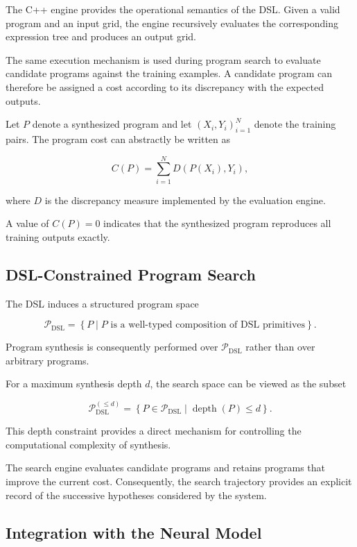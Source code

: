 \documentclass[final]{nesy2027}
\begin{document}
The C++ engine provides the operational semantics of the DSL. Given a valid
program and an input grid, the engine recursively evaluates the corresponding
expression tree and produces an output grid.

The same execution mechanism is used during program search to evaluate
candidate programs against the training examples. A candidate program can
therefore be assigned a cost according to its discrepancy with the expected
outputs.

Let $P$ denote a synthesized program and let
$(X_i,Y_i)_{i=1}^{N}$ denote the training pairs. The program cost can
abstractly be written as

\[
C(P) =
\sum_{i=1}^{N}
D\left(P(X_i),Y_i\right),
\]

where $D$ is the discrepancy measure implemented by the evaluation engine.

A value of $C(P)=0$ indicates that the synthesized program reproduces all
training outputs exactly.

\subsection{DSL-Constrained Program Search}
\label{subsec:dsl-search}

The DSL induces a structured program space

\[
\mathcal{P}_{\mathrm{DSL}}
=
\left\{
P \mid P \text{ is a well-typed composition of DSL primitives}
\right\}.
\]

Program synthesis is consequently performed over
$\mathcal{P}_{\mathrm{DSL}}$ rather than over arbitrary programs.

For a maximum synthesis depth $d$, the search space can be viewed as the
subset

\[
\mathcal{P}_{\mathrm{DSL}}^{(\leq d)}
=
\left\{
P\in\mathcal{P}_{\mathrm{DSL}}
\mid
\operatorname{depth}(P)\leq d
\right\}.
\]

This depth constraint provides a direct mechanism for controlling the
computational complexity of synthesis.

The search engine evaluates candidate programs and retains programs that
improve the current cost. Consequently, the search trajectory provides an
explicit record of the successive hypotheses considered by the system.

\subsection{Integration with the Neural Model}
\label{subsec:dsl-neural-integration}
\end{document}
